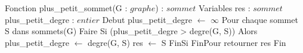 \begin{algorithm}[caption={Plus petit sommet}] \label{alg:pps}
    Fonction plus_petit_sommet(G : $graphe$) : $sommet$
    Variables
        res : $sommet$
        plus_petit_degre : $entier$
    Debut
        plus_petit_degre $\gets$ $\infty$
        Pour chaque sommet S dans sommets(G) Faire
            Si (plus_petit_degre > degre(G, S)) Alors
                plus_petit_degre $\gets$ degre(G, S)
                res $\gets$ S
            FinSi
        FinPour
        retourner res
    Fin
\end{algorithm}